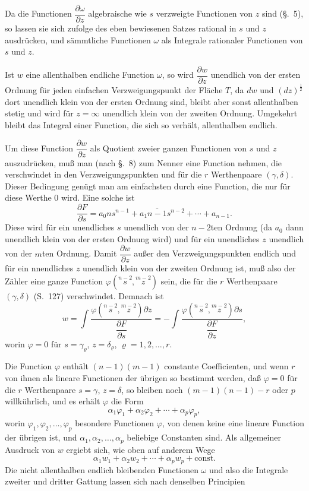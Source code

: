 \documentclass{article}
\begin{document}
Da die Functionen $\dfrac{\partial\omega}{\partial z}$ algebraische wie $s$ verzweigte Functionen von $z$ sind (§.~5), so lassen sie sich zufolge des eben bewiesenen Satzes rational in $s$ und $z$ ausdrücken, und sämmtliche Functionen $\omega$ als Integrale rationaler Functionen von $s$ und $z$.

Ist $w$ eine allenthalben endliche Function $\omega$, so wird $\dfrac{\partial w}{\partial z}$ unendlich von der ersten Ordnung für jeden einfachen Verzweigungspunkt der Fläche $T$, da $dw$ und $(dz)^{\frac{1}{2}}$ dort unendlich klein von der ersten Ordnung sind, bleibt aber sonst allenthalben stetig und wird für $z = \infty$ unendlich klein von der zweiten Ordnung. Umgekehrt bleibt das Integral einer Function, die sich so verhält, allenthalben endlich.

Um diese Function $\dfrac{\partial w}{\partial z}$ als Quotient zweier ganzen Functionen von $s$ und $z$ auszudrücken, muß man (nach §.~8) zum Nenner eine Function nehmen, die verschwindet in den Verzweigungspunkten und für die $r$ Werthenpaare $(\gamma, \delta)$. Dieser Bedingung genügt man am einfachsten durch eine Function, die nur für diese Werthe 0 wird. Eine solche ist
\[ \frac{\partial F}{\partial s} = a_{0} n s^{n-1} + a_{1} \overline{n-1} s^{n-2} + \cdots + a_{n-1}. \]
Diese wird für ein unendliches $s$ unendlich von der $n-2$ten Ordnung (da $a_{0}$ dann unendlich klein von der ersten Ordnung wird) und für ein unendliches $z$ unendlich von der $m$ten Ordnung. Damit $\dfrac{\partial w}{\partial z}$ außer den Verzweigungspunkten endlich und für ein nnendliches $z$ unendlich klein von der zweiten Ordnung ist, muß also der Zähler eine ganze Function $\varphi(\overset{n-2}{s}, \overset{m-2}{z})$ sein, die für die $r$ Werthenpaare $(\gamma, \delta)$ (S.~127) verschwindet. Demnach ist
\[ w = \int \frac{\varphi(\overset{n-2}{s}, \overset{m-2}{z}) \partial z}{\dfrac{\partial F}{\partial s}} = -\int \frac{\varphi(\overset{n-2}{s}, \overset{m-2}{z}) \partial s}{\dfrac{\partial F}{\partial z}}, \]
worin $\varphi = 0$ für $s = \gamma_{\varrho}$, $z = \delta_{\varrho}$, $\varrho = 1, 2, \ldots, r$.

Die Function $\varphi$ enthält $(n-1)(m-1)$ constante Coefficienten, und wenn $r$ von ihnen als lineare Functionen der übrigen so bestimmt werden, daß $\varphi = 0$ für die $r$ Werthenpaare $s = \gamma$, $z = \delta$, so bleiben noch $(m-1)(n-1)-r$ oder $p$ willkührlich, und es erhält $\varphi$ die Form
\[ \alpha_{1}\varphi_{1} + \alpha_{2}\varphi_{2} + \cdots + \alpha_{p}\varphi_{p}, \]
worin $\varphi_{1}, \varphi_{2}, \ldots, \varphi_{p}$ besondere Functionen $\varphi$, von denen keine eine lineare Function der übrigen ist, und $\alpha_{1}, \alpha_{2}, \ldots, \alpha_{p}$ beliebige Constanten sind. Als allgemeiner Ausdruck von $w$ ergiebt sich, wie oben auf anderem Wege
\[ \alpha_{1} w_{1} + \alpha_{2} w_{2} + \cdots + \alpha_{p} w_{p} + \text{const.} \]
Die nicht allenthalben endlich bleibenden Functionen $\omega$ und also die Integrale zweiter und dritter Gattung lassen sich nach denselben Principien
\end{document}
